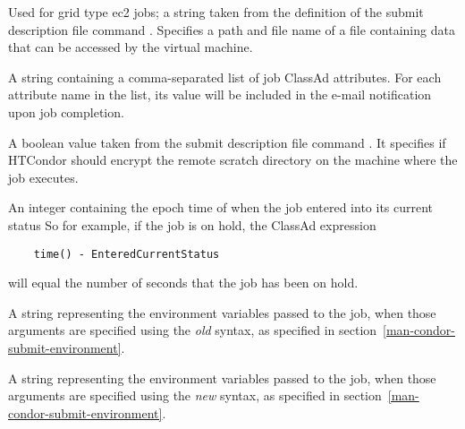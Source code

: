 \begin{description}
\item[\AdAttr{EC2UserDataFile}:] 
Used for grid type ec2 jobs;
a string taken from the definition of the submit description file command
.
Specifies a path and file name of a file containing 
data that can be accessed by the virtual machine.

\item[\AdAttr{EmailAttributes}:]  A string containing a comma-separated
list of job ClassAd attributes. For each attribute name in the list,
its value will be included in the e-mail notification upon job completion.

\item[\AdAttr{EncryptExecuteDirectory}:]
A boolean value taken from the submit description file command
. 
It specifies if HTCondor should encrypt the remote scratch directory 
on the machine where the job executes.

\item[\AdAttr{EnteredCurrentStatus}:]  An integer containing the
epoch time of when the job entered into its current status
So for example, if the job is on hold, the ClassAd expression
\begin{verbatim}
    time() - EnteredCurrentStatus
\end{verbatim}
will equal the number of seconds that the job has been on hold.

\item[\AdAttr{Env}:]  A string representing the environment variables 
passed to the job, when those arguments are specified using the
\emph{old} syntax, as specified in section~\ref{man-condor-submit-environment}.

\item[\AdAttr{Environment}:]  A string representing the environment variables
passed to the job, when those arguments are specified using the
\emph{new} syntax, as specified in section~\ref{man-condor-submit-environment}.


\end{description}

